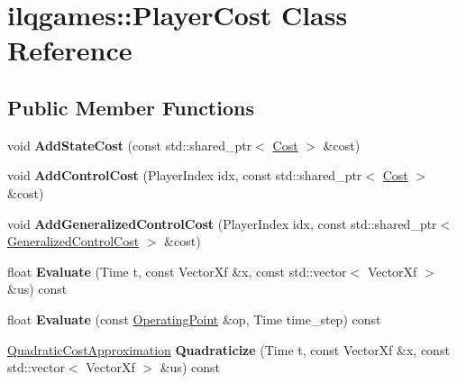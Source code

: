 \hypertarget{classilqgames_1_1_player_cost}{}\section{ilqgames\+:\+:Player\+Cost Class Reference}
\label{classilqgames_1_1_player_cost}
\subsection*{Public Member Functions}
\begin{DoxyCompactItemize}
\item 
void {\bfseries Add\+State\+Cost} (const std\+::shared\+\_\+ptr$<$ \hyperlink{classilqgames_1_1_cost}{Cost} $>$ \&cost)\hypertarget{classilqgames_1_1_player_cost_a3135d5f4c7722edc1ae385e0ecafcc87}{}\label{classilqgames_1_1_player_cost_a3135d5f4c7722edc1ae385e0ecafcc87}

\item 
void {\bfseries Add\+Control\+Cost} (Player\+Index idx, const std\+::shared\+\_\+ptr$<$ \hyperlink{classilqgames_1_1_cost}{Cost} $>$ \&cost)\hypertarget{classilqgames_1_1_player_cost_aba4df0e6414aba024c86bf77fe57f819}{}\label{classilqgames_1_1_player_cost_aba4df0e6414aba024c86bf77fe57f819}

\item 
void {\bfseries Add\+Generalized\+Control\+Cost} (Player\+Index idx, const std\+::shared\+\_\+ptr$<$ \hyperlink{classilqgames_1_1_generalized_control_cost}{Generalized\+Control\+Cost} $>$ \&cost)\hypertarget{classilqgames_1_1_player_cost_aebc6b1776b4f5d71df75b68028442efd}{}\label{classilqgames_1_1_player_cost_aebc6b1776b4f5d71df75b68028442efd}

\item 
float {\bfseries Evaluate} (Time t, const Vector\+Xf \&x, const std\+::vector$<$ Vector\+Xf $>$ \&us) const \hypertarget{classilqgames_1_1_player_cost_ac1ad99a1822d97a53d084fd9da162cb1}{}\label{classilqgames_1_1_player_cost_ac1ad99a1822d97a53d084fd9da162cb1}

\item 
float {\bfseries Evaluate} (const \hyperlink{structilqgames_1_1_operating_point}{Operating\+Point} \&op, Time time\+\_\+step) const \hypertarget{classilqgames_1_1_player_cost_a8c7fc17986dfb478df17cf9f8da85926}{}\label{classilqgames_1_1_player_cost_a8c7fc17986dfb478df17cf9f8da85926}

\item 
\hyperlink{structilqgames_1_1_quadratic_cost_approximation}{Quadratic\+Cost\+Approximation} {\bfseries Quadraticize} (Time t, const Vector\+Xf \&x, const std\+::vector$<$ Vector\+Xf $>$ \&us) const \hypertarget{classilqgames_1_1_player_cost_ad3962847f8eda8bcfecf2096e6abccb6}{}\label{classilqgames_1_1_player_cost_ad3962847f8eda8bcfecf2096e6abccb6}


\end{DoxyCompactItemize}
